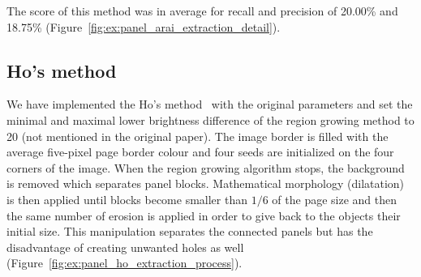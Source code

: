 The score of this method was in average for recall and precision of 20.00\% and 18.75\% (Figure~\ref{fig:ex:panel_arai_extraction_detail}).




\subsection{Ho's method} %
We have implemented the Ho's method~\cite{Ho2012} with the original parameters and set the minimal and maximal lower brightness difference of the region growing method to 20 (not mentioned in the original paper).
The image border is filled with the average five-pixel page border colour and four seeds are initialized on the four corners of the image.
When the region growing algorithm stops, the background is removed which separates panel blocks.
Mathematical morphology (dilatation) is then applied until blocks become smaller than $1/6$ of the page size and then the same number of erosion is applied in order to give back to the objects their initial size.
This manipulation separates the connected panels but has the disadvantage of creating unwanted holes as well (Figure~\ref{fig:ex:panel_ho_extraction_process}).

